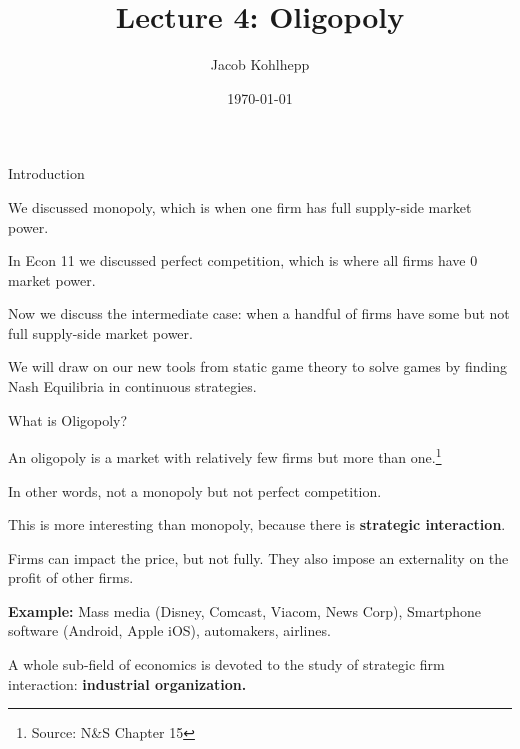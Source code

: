 \documentclass[aspectratio=169]{beamer}
\title[Oligopoly]{Lecture 4: Oligopoly} %
\author{Jacob Kohlhepp} %
\institute[UCLA] %
{
Econ 101 \\ %
\medskip
}
\date{\today} %
\newenvironment{wideitemize}{\itemize\addtolength{\itemsep}{10pt}}{\enditemize}
\begin{document}
\begin{frame}
\titlepage %
\end{frame}

\begin{frame}{Introduction}
\begin{wideitemize}
    \item We discussed monopoly, which is when one firm has full supply-side market power.
    \item In Econ 11 we discussed perfect competition, which is where all firms have 0 market power.
    \item Now we discuss the intermediate case: when a handful of firms have some but not full supply-side market power.
    \item We will draw on our new tools from static game theory to solve games by finding Nash Equilibria in continuous strategies.
\end{wideitemize}

\end{frame}

\begin{frame}{What is Oligopoly?}
\begin{definition}
    An oligopoly is a market with relatively few firms but more than one.\footnote{Source: N\&S Chapter 15}
\end{definition}
\begin{wideitemize}
    \item In other words, not a monopoly but not perfect competition.
    \item This is more interesting than monopoly, because there is \textbf{strategic interaction}.
    \item Firms can impact the price, but not fully. They also impose an externality on the profit of other firms.
    \item \textbf{Example:} Mass media (Disney, Comcast, Viacom, News Corp), Smartphone software (Android, Apple iOS), automakers, airlines.
    \item A whole sub-field of economics is devoted to the study of strategic firm interaction: \textbf{industrial organization.}
\end{wideitemize}
\end{frame}
\end{document}
